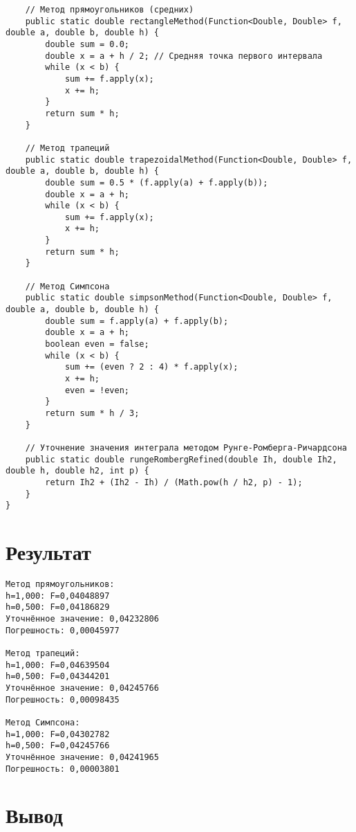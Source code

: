 \begin{verbatim}
    // Метод прямоугольников (средних)
    public static double rectangleMethod(Function<Double, Double> f, double a, double b, double h) {
        double sum = 0.0;
        double x = a + h / 2; // Средняя точка первого интервала
        while (x < b) {
            sum += f.apply(x);
            x += h;
        }
        return sum * h;
    }

    // Метод трапеций
    public static double trapezoidalMethod(Function<Double, Double> f, double a, double b, double h) {
        double sum = 0.5 * (f.apply(a) + f.apply(b));
        double x = a + h;
        while (x < b) {
            sum += f.apply(x);
            x += h;
        }
        return sum * h;
    }

    // Метод Симпсона
    public static double simpsonMethod(Function<Double, Double> f, double a, double b, double h) {
        double sum = f.apply(a) + f.apply(b);
        double x = a + h;
        boolean even = false;
        while (x < b) {
            sum += (even ? 2 : 4) * f.apply(x);
            x += h;
            even = !even;
        }
        return sum * h / 3;
    }

    // Уточнение значения интеграла методом Рунге-Ромберга-Ричардсона
    public static double rungeRombergRefined(double Ih, double Ih2, double h, double h2, int p) {
        return Ih2 + (Ih2 - Ih) / (Math.pow(h / h2, p) - 1);
    }
}
\end{verbatim}

\section*{Результат}

\begin{verbatim}
Метод прямоугольников:
h=1,000: F=0,04048897
h=0,500: F=0,04186829
Уточнённое значение: 0,04232806
Погрешность: 0,00045977

Метод трапеций:
h=1,000: F=0,04639504
h=0,500: F=0,04344201
Уточнённое значение: 0,04245766
Погрешность: 0,00098435

Метод Симпсона:
h=1,000: F=0,04302782
h=0,500: F=0,04245766
Уточнённое значение: 0,04241965
Погрешность: 0,00003801
\end{verbatim}

\section*{Вывод}

